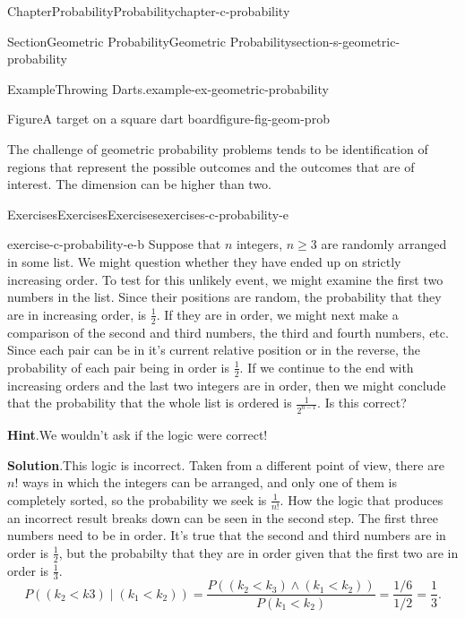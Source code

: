 \documentclass[oneside,10pt,]{book}
\newcommand{\blocktitlefont}{\relax}
\numberwithin{equation}{section}
\newcommand{\lt}{<}
\begin{document}
\begin{chapterptx}{Chapter}{Probability}{}{Probability}{}{}{chapter-c-probability}
\begin{sectionptx}{Section}{Geometric Probability}{}{Geometric Probability}{}{}{section-s-geometric-probability}
\begin{example}{Example}{Throwing Darts.}{example-ex-geometric-probability}
\begin{figureptx}{Figure}{A target on a square dart board}{figure-fig-geom-prob}{}
\begin{image}{0.2}{0.6}{0.2}
\end{image}%
\tcblower
\end{figureptx}%
\end{example}
The challenge of geometric probability problems tends to be identification of regions that represent the possible outcomes and the outcomes that are of interest. The dimension can be higher than two.%
\end{sectionptx}
%
%
\typeout{************************************************}
\typeout{************************************************}
%
\begin{exercises-section}{Exercises}{Exercises}{}{Exercises}{}{}{exercises-c-probability-e}
\begin{divisionexercise}{1}{}{}{exercise-c-probability-e-b}%
Suppose that \(n\)  integers, \(n \geq 3\) are randomly arranged in some list.  We might question whether they have ended up on strictly increasing order.   To test for this unlikely event, we might examine the first two numbers in the list.  Since their positions are random, the probability that they are in increasing order, is \(\frac{1}{2}\). If they are in order, we might next make a comparison of the second and third numbers, the third and fourth numbers, etc. Since each pair can be in it's current relative position or in the reverse, the probability of each pair being in order is \(\frac{1}{2}\). If we continue to the end with increasing orders and the last two integers are in order, then we might conclude that the probability that the whole list is ordered is \(\frac{1}{2^{n-1}}\).  Is this correct?%
\par\smallskip%
\noindent\textbf{\blocktitlefont Hint}.\hypertarget{hint-c-probability-e-b-b}{}\quad{}We wouldn't ask if the logic were correct!%
\par\smallskip%
\noindent\textbf{\blocktitlefont Solution}.\hypertarget{solution-c-probability-e-b-c}{}\quad{}This logic is incorrect.  Taken from a different point of view, there are \(n!\) ways in which the integers can be arranged, and only one of them is completely sorted, so the probability we seek is \(\frac{1}{n!}\).  How the logic that produces an incorrect result breaks down can be seen in the second step.  The first three numbers need to be in order.  It's true that the second and third numbers are in order is \(\frac{1}{2}\), but the probabilty that they are in order given that the first two are in order is \(\frac{1}{3}\).%
\begin{equation*}
P((k_2\lt k3)  \mid (k_1\lt k_2))= \frac{P((k_2\lt k_3) \land (k_1\lt k_2))}{P(k_1\lt k_2)}=\frac{1/6}{1/2}= \frac{1}{3}.

\end{equation*}
\end{divisionexercise}
\end{exercises-section}
\end{chapterptx}
\end{document}
